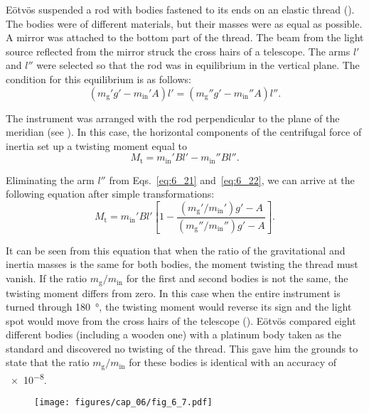 E\"{o}tv\"{o}s suspended a rod with bodies fastened to its ends on an elastic thread (). The bodies were of different materials, but their masses were as equal as possible. A mirror was attached to the bottom part of the thread. The beam from the light source reflected from the mirror struck the cross hairs of a telescope. The arms $l'$ and $l''$ were selected so that the rod was in equilibrium in the vertical plane. The condition for this equilibrium is as follows:
\begin{equation}\label{eq:6_21}
	(m_{\text{g}}'g' - m_{\text{in}}'A)l' = (m_{\text{g}}''g' - m_{\text{in}}''A)l''.
\end{equation}

\noindent
The instrument was arranged with the rod perpendicular to the plane of the meridian (see ). In this case, the horizontal components of the centrifugal force of inertia set up a twisting moment equal to
\begin{equation}\label{eq:6_22}
	M_{\text{t}} = m_{\text{in}}'Bl' - m_{\text{in}}''Bl''.
\end{equation}

\noindent
Eliminating the arm $l''$ from Eqs.~\eqref{eq:6_21} and~\eqref{eq:6_22}, we can arrive at the following equation after simple transformations:
\begin{equation*}
	M_{\text{t}} = m_{\text{in}}'Bl' \left[1 - \frac{(m_{\text{g}}'/m_{\text{in}}') g' - A}{(m_{\text{g}}''/m_{\text{in}}'') g' - A} \right].
\end{equation*}

\noindent
It can be seen from this equation that when the ratio of the gravitational and inertia masses is the same for both bodies, the moment twisting the thread must vanish. If the ratio $m_{\text{g}}/m_{\text{in}}$ for the first and second bodies is not the same, the twisting moment differs from zero. In this case when the entire instrument is turned through \SI{180}{\degree}, the twisting moment would reverse its sign and the light spot would move from the cross hairs of the telescope (). E\"{o}tv\"{o}s compared eight different bodies (including a wooden one) with a platinum body taken as the standard and discovered no twisting of the thread. This gave him the grounds to state that the ratio $m_{\text{g}}/m_{\text{in}}$ for these bodies is identical with an accuracy of \num{e-8}.

\begin{figure}[t]
	\begin{center}
		\texttt{[image: figures/cap\_06/fig\_6\_7.pdf]}
		\caption[]{}
		\label{fig:6_7}
	\end{center}
	\vspace{-0.7cm}
\end{figure}

